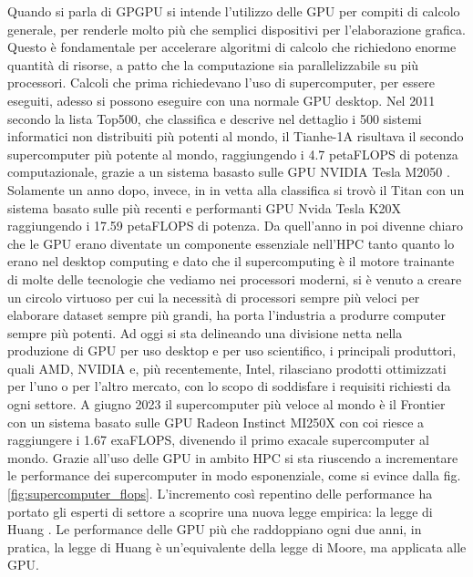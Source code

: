Quando si parla di \gls{GPGPU} si intende l'utilizzo delle GPU per compiti di calcolo generale, per renderle molto più che semplici dispositivi per l'elaborazione grafica. Questo è fondamentale per accelerare algoritmi di calcolo che richiedono enorme quantità di risorse, a patto che la computazione sia parallelizzabile su più processori.
Calcoli che prima richiedevano l'uso di supercomputer, per essere eseguiti, adesso si possono eseguire con una normale GPU desktop. 
Nel 2011 secondo la lista Top500, che classifica e descrive nel dettaglio i 500 sistemi informatici non distribuiti più potenti al mondo, il Tianhe-1A risultava il secondo supercomputer più potente al mondo, raggiungendo i 4.7 petaFLOPS di potenza computazionale, grazie a un sistema basasto sulle GPU NVIDIA Tesla M2050 \cite[]{Tianhe-1A:link}. Solamente un anno dopo, invece, in in vetta alla classifica si trovò il Titan \cite[]{Titan:link} con un sistema basato sulle più recenti e performanti GPU Nvida Tesla K20X raggiungendo i 17.59 petaFLOPS di potenza.
Da quell'anno in poi divenne chiaro che le GPU erano diventate un componente essenziale nell'HPC tanto quanto lo erano nel desktop computing e dato che il supercomputing è il motore trainante di molte delle tecnologie che vediamo nei processori moderni, si è venuto a creare un circolo virtuoso per cui la necessità di processori sempre più veloci per elaborare dataset sempre più grandi, ha porta l'industria a produrre computer sempre più potenti. Ad oggi si sta delineando una divisione netta nella produzione di GPU per uso desktop e per uso scientifico, i principali produttori, quali AMD, NVIDIA e, più recentemente, Intel, rilasciano prodotti ottimizzati per l'uno o per l'altro mercato, con lo scopo di soddisfare i requisiti richiesti da ogni settore. A giugno 2023 il supercomputer più veloce al mondo è il Frontier \cite[]{Frontier:link} con un sistema basato sulle GPU Radeon Instinct MI250X con coi riesce a raggiungere i 1.67 exaFLOPS, divenendo il primo exacale supercomputer al mondo. Grazie all'uso delle GPU in ambito HPC si sta riuscendo a incrementare le performance dei supercomputer in modo esponenziale, come si evince dalla fig. \ref{fig:supercomputer_flops}. L'incremento così repentino delle performance ha portato gli esperti di settore a scoprire una nuova legge empirica: la legge di Huang \cite[]{Huang:law}. Le performance delle GPU più che raddoppiano ogni due anni, in pratica, la legge di Huang è un'equivalente della legge di Moore, ma applicata alle GPU.

